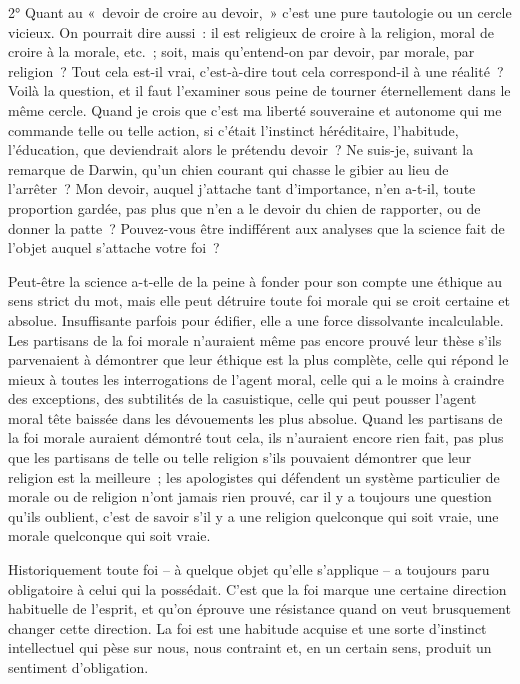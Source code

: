 \documentclass[french,twoside]{book} %
\begin{document}
2° Quant au « devoir de croire au devoir, » c’est une pure tautologie ou un cercle vicieux. On pourrait dire aussi : il est religieux de croire à la religion, moral de croire à la morale, etc. ; soit, mais qu’entend-on par devoir, par morale, par religion ? Tout cela est-il vrai, c’est-à-dire tout cela correspond-il à une réalité ? Voilà la question, et il faut l’examiner sous peine de tourner éternellement dans le même cercle. Quand je crois que c’est ma liberté souveraine et autonome qui me commande telle ou telle action, si c’était l’instinct héréditaire, l’habitude, l’éducation, que deviendrait alors le prétendu devoir ? Ne suis-je, suivant la remarque de Darwin, qu’un chien courant qui chasse le gibier au lieu de l’arrêter ? Mon devoir, auquel j’attache tant d’importance, n’en a-t-il, toute proportion gardée, pas plus que n’en a le devoir du chien de rapporter, ou de donner la patte ? Pouvez-vous être indifférent aux analyses que la science fait de l’objet auquel s’attache votre foi ?\par
Peut-être la science a-t-elle de la peine à fonder pour son compte une éthique au sens strict du mot, mais elle peut détruire toute foi morale qui se croit certaine et absolue. Insuffisante parfois pour édifier, elle a une force dissolvante incalculable. Les partisans de la foi morale n’auraient même pas encore prouvé leur thèse s’ils parvenaient à démontrer que leur éthique est la plus complète, celle qui répond le mieux à toutes les interrogations de l’agent moral, celle qui a le moins à craindre des exceptions, des subtilités de la casuistique, celle qui peut pousser l’agent moral tête baissée dans les dévouements les plus absolue. Quand les partisans de la foi morale auraient démontré tout cela, ils n’auraient encore rien fait, pas plus que les partisans de telle ou telle religion s’ils pouvaient démontrer que leur religion est la meilleure ; les apologistes qui défendent un système particulier de morale ou de religion n’ont jamais rien prouvé, car il y a toujours une question qu’ils oublient, c’est de savoir s’il y a une religion quelconque qui soit vraie, une morale quelconque qui soit vraie.\par
Historiquement toute foi – à quelque objet qu’elle s’applique – a toujours paru obligatoire à celui qui la possédait. C’est que la foi marque une certaine direction habituelle de l’esprit, et qu’on éprouve une résistance quand on veut brusquement changer cette direction. La foi est une habitude acquise et une sorte d’instinct intellectuel qui pèse sur nous, nous contraint et, en un certain sens, produit un sentiment d’obligation.\par
\end{document}

